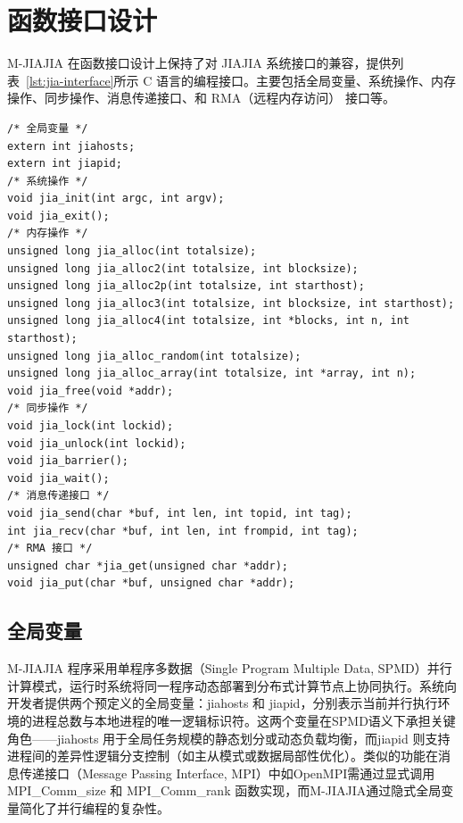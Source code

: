 {    \section{函数接口设计}
    M-JIAJIA 在函数接口设计上保持了对 JIAJIA 系统接口的兼容，提供列表~\ref{lst:jia-interface}所示 C 语言的编程接口。主要包括全局变量、系统操作、内存操作、同步操作、消息传递接口、和 RMA（远程内存访问） 接口等。
    \begin{lstlisting}[style=CStyle, caption={M-JIAJIA C 接口总览}, label={lst:jia-interface}]
/* 全局变量 */
extern int jiahosts;
extern int jiapid;
/* 系统操作 */
void jia_init(int argc, int argv);
void jia_exit();
/* 内存操作 */
unsigned long jia_alloc(int totalsize);
unsigned long jia_alloc2(int totalsize, int blocksize);
unsigned long jia_alloc2p(int totalsize, int starthost);
unsigned long jia_alloc3(int totalsize, int blocksize, int starthost);
unsigned long jia_alloc4(int totalsize, int *blocks, int n, int starthost);
unsigned long jia_alloc_random(int totalsize);
unsigned long jia_alloc_array(int totalsize, int *array, int n);
void jia_free(void *addr);
/* 同步操作 */
void jia_lock(int lockid);
void jia_unlock(int lockid);
void jia_barrier();
void jia_wait();
/* 消息传递接口 */
void jia_send(char *buf, int len, int topid, int tag);
int jia_recv(char *buf, int len, int frompid, int tag);
/* RMA 接口 */
unsigned char *jia_get(unsigned char *addr);
void jia_put(char *buf, unsigned char *addr);
\end{lstlisting}

    \subsection{全局变量}
    M-JIAJIA 程序采用单程序多数据（Single Program Multiple Data, SPMD）并行计算模式，运行时系统将同一程序动态部署到分布式计算节点上协同执行。系统向开发者提供两个预定义的全局变量：jiahosts 和 jiapid，分别表示当前并行执行环境的进程总数与本地进程的唯一逻辑标识符。这两个变量在SPMD语义下承担关键角色——jiahosts 用于全局任务规模的静态划分或动态负载均衡，而jiapid 则支持进程间的差异性逻辑分支控制（如主从模式或数据局部性优化）。类似的功能在消息传递接口（Message Passing Interface, MPI）中如OpenMPI需通过显式调用 MPI\_Comm\_size 和 MPI\_Comm\_rank 函数实现，而M-JIAJIA通过隐式全局变量简化了并行编程的复杂性。
}

